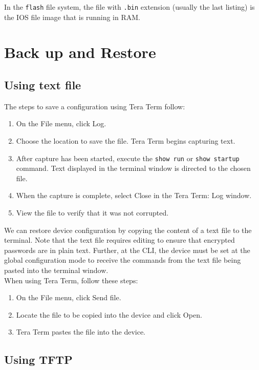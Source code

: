 In the \verb|flash| file system, the file with \verb|.bin| extension (usually the last listing) is the IOS file image that is running in RAM. 

\section{Back up and Restore}

\subsection{Using text file}

The steps to save a configuration using Tera Term follow:
\begin{enumerate}
\item On the File menu, click Log.
\item Choose the location to save the file. Tera Term begins capturing text.
\item After capture has been started, execute the \verb|show run| or \verb|show startup| command. Text displayed in the terminal window is directed to the chosen file.
\item When the capture is complete, select Close in the Tera Term: Log window.
\item View the file to verify that it was not corrupted.
\end{enumerate}

We can restore device configuration by copying the content of a text file to the terminal. Note that the text file requires editing to ensure that encrypted passwords are in plain text. Further, at the CLI, the device must be set at the global configuration mode to receive the commands from the text file being pasted into the terminal window.\\

When using Tera Term, follow these steps:
\begin{enumerate}
\item On the File menu, click Send file.
\item Locate the file to be copied into the device and click Open.
\item Tera Term pastes the file into the device.
\end{enumerate}

\subsection{Using TFTP}

